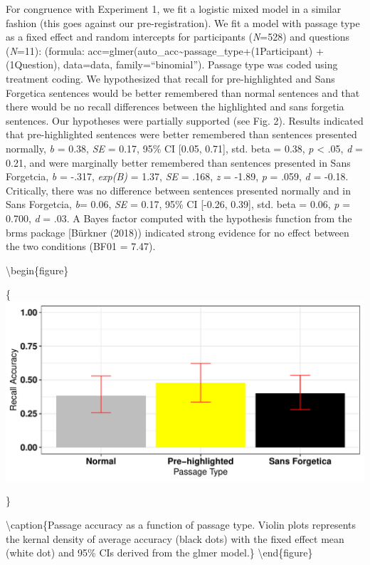 \documentclass[english,pdf]{apa6}
\begin{document}
For congruence with Experiment 1, we fit a logistic mixed model in a similar fashion (this goes against our pre-registration). We fit a model with passage type as a fixed effect and random intercepts for participants (\emph{N}=528) and questions (\emph{N}=11): (formula: acc=glmer(auto\_acc\textasciitilde{}passage\_type+(1\textbar{}Participant) + (1\textbar{}Question), data=data, family=\enquote{binomial}). Passage type was coded using treatment coding. We hypothesized that recall for pre-highlighted and Sans Forgetica sentences would be better remembered than normal sentences and that there would be no recall differences between the highlighted and sans forgetia sentences. Our hypotheses were partially supported (see Fig. 2). Results indicated that pre-highlighted sentences were better remembered than sentences presented normally, \emph{b} = 0.38, \emph{SE} = 0.17, 95\% CI {[}0.05, 0.71{]}, std. beta = 0.38, \emph{p} \textless{} .05, \emph{d} = 0.21, and were marginally better remembered than sentences presented in Sans Forgetcia, \emph{b} = -.317, \emph{exp(B)} = 1.37, \emph{SE} = .168, \emph{z} = -1.89, \emph{p} = .059, \emph{d} = -0.18. Critically, there was no difference between sentences presented normally and in Sans Forgetcia, \emph{b}= 0.06, \emph{SE} = 0.17, 95\% CI {[}-0.26, 0.39{]}, std. beta = 0.06, \emph{p} = 0.700, \emph{d} = .03. A Bayes factor computed with the hypothesis function from the brms package {[}Bürkner (2018)) indicated strong evidence for no effect between the two conditions (BF01 = 7.47).

\textbackslash{}begin\{figure\}

\{\centering \includegraphics{SF_Paper_files/figure-latex/unnamed-chunk-3-1}

\}

\textbackslash{}caption\{Passage accuracy as a function of passage type. Violin plots represents the kernal density of average accuracy (black dots) with the fixed effect mean (white dot) and 95\% CIs derived from the glmer model.\}\label{fig:unnamed-chunk-3}
\textbackslash{}end\{figure\}
\end{document}
